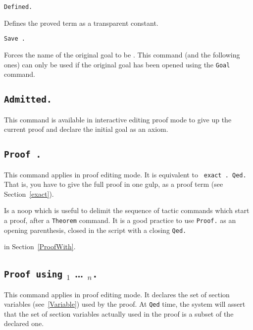 \begin{Variants}

\item {\tt Defined.}
\label{Defined} 

  Defines the proved term as a transparent constant.

\item {\tt Save {\ident}.}
  
  Forces the name of the original goal to be {\ident}.  This command
  (and the following ones) can only be used if the original goal has
  been opened using the {\tt Goal} command.

\end{Variants}

\subsection[\tt Admitted.]{\tt Admitted.\label{Admitted}}
This command is available in interactive editing proof mode to give up
the current proof and declare the initial goal as an axiom.

\subsection[\tt Proof {\term}.]{\tt Proof {\term}.
\label{BeginProof}}
This command applies in proof editing mode. It is equivalent to {\tt
  exact {\term}. Qed.} That is, you have to give the full proof in
one gulp, as a proof term (see Section~\ref{exact}).

  
  Is a noop which is useful to delimit the sequence of tactic commands
  which start a proof, after a {\tt Theorem} command.  It is a good
  practice to use {\tt Proof.} as an opening parenthesis, closed in
  the script with a closing {\tt Qed.}

 in Section~\ref{ProofWith}.

\subsection[{\tt Proof using} {\ident$_1$} {\ldots} {\ident$_n$}{\tt .}]
{{\tt Proof using} {\ident$_1$} {\ldots} {\ident$_n$}{\tt .}
 \label{ProofUsing}}

This command applies in proof editing mode. 
It declares the set of section variables (see~\ref{Variable}) 
used by the proof. At {\tt Qed} time, the system will assert that 
the set of section variables actually used in the proof is a subset of
the declared one.

